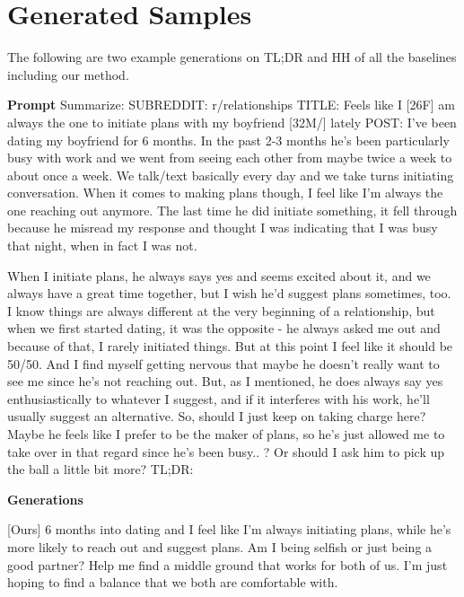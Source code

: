 \vspace{5em}
\section{Generated Samples}
The following are two example generations on TL;DR and HH of all the baselines including our method.
\begin{tcolorbox}[colback=blue!5!white,colframe=blue!75!black, title= TL;DR Generation Samples]
  \textbf{Prompt}
 Summarize: SUBREDDIT: r/relationships
TITLE: Feels like I [26F] am always the one to initiate plans with my boyfriend [32M/] lately
POST: I've been dating my boyfriend for 6 months. In the past 2-3 months he's been particularly busy with work and we went from seeing each other from maybe twice a week to about once a week. We talk/text basically every day and we take turns initiating conversation. When it comes to making plans though, I feel like I'm always the one reaching out anymore. The last time he did initiate something, it fell through because he misread my response and thought I was indicating that I was busy that night, when in fact I was not.

When I initiate plans, he always says yes and seems excited about it, and we always have a great time together, but I wish he'd suggest plans sometimes, too. I know things are always different at the very beginning of a relationship, but when we first started dating, it was the opposite - he always asked me out and because of that, I rarely initiated things. But at this point I feel like it should be 50/50. And I find myself getting nervous that maybe he doesn't really want to see me since he's not reaching out. But, as I mentioned, he does always say yes enthusiastically to whatever I suggest, and if it interferes with his work, he'll usually suggest an alternative. So, should I just keep on taking charge here? Maybe he feels like I prefer to be the maker of plans, so he's just allowed me to take over in that regard since he's been busy.. ? Or should I ask him to pick up the ball a little bit more?
TL;DR: 

  \tcblower
  \textbf{Generations}
  
  [Ours]
  6 months into dating and I feel like I'm always initiating plans, while he's more likely to reach out and suggest plans. Am I being selfish or just being a good partner? Help me find a middle ground that works for both of us. I'm just hoping to find a balance that we both are comfortable with.

\bigskip


\end{tcolorbox}
